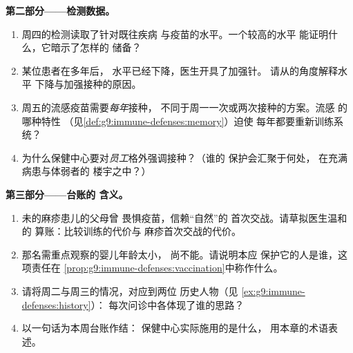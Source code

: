 \begin{problem}
\medskip\noindent\textbf{第二部分——检测数据。}
\begin{enumerate}[resume]
  \item 周四的检测读取了针对既往疾病
        与疫苗的水平。一个较高的水平
        能证明什么，它暗示了怎样的
        储备？
  \item 某位患者在多年后，
        水平已经下降，医生开具了加强针。
        请从的角度解释水平
        下降与加强接种的原因。
  \item 周五的流感疫苗需要\emph{每年}接种，
        不同于周一一次或两次接种的方案。流感
        的哪种特性
        （见\cref{def:g9:immune-defenses:memory}）迫使
        每年都要重新训练系统？
  \item 为什么保健中心要对\emph{员工}格外强调接种？（谁的
        保护会汇聚于何处，
        在充满病患与体弱者的
        楼宇之中？）
\end{enumerate}

\medskip\noindent\textbf{第三部分——台账的
含义。}
\begin{enumerate}[resume]
  \item 未的麻疹患儿的父母曾
        畏惧疫苗，信赖“自然”的
        首次交战。请草拟医生温和的
        算账：比较训练的代价与
        麻疹首次交战的代价。
  \item 那名需重点观察的婴儿年龄太小，
        尚不能。请说明本应
        保护它的人是谁，这项责任在
        \cref{prop:g9:immune-defenses:vaccination}中称作什么。
  \item 请将周二与周三的情况，对应到两位
        历史人物（见
        \cref{ex:g9:immune-defenses:history}）：
        每次问诊中各体现了谁的思路？
  \item 以一句话为本周台账作结：
        保健中心实际施用的是什么，
        用本章的术语表述。
\end{enumerate}
\end{problem}
